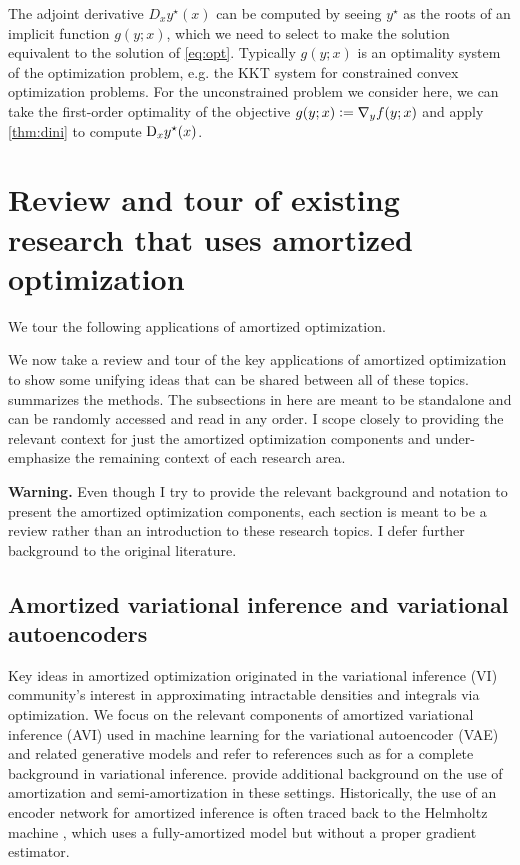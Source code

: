 \documentclass[twoside,11pt]{article}
\newcommand{\eg}{e.g.\xspace}
\begin{document}
The adjoint derivative $D_x y^\star(x)$ can be computed
by seeing $y^\star$ as the roots of an implicit
function $g(y;x)$, which we need to select to
make the solution equivalent to the solution
of \cref{eq:opt}.
Typically $g(y;x)$ is an optimality system of
the optimization problem, \eg the KKT system
for constrained convex optimization problems.
For the unconstrained problem we consider here,
we can take the first-order optimality of
the objective $g(y;x) \vcentcolon= \nabla_y f(y; x)$
and apply \cref{thm:dini} to compute
$\mathrm{D}_x y^\star(x)$.


\section{Review and tour of existing research that uses amortized optimization}
\label{sec:apps}

\begin{table}[t]
  \caption{We tour the following applications of amortized optimization.}
  \vspace{3mm}
  
  \label{tab:rw}
\end{table}

We now take a review and tour of the key applications
of amortized optimization to show some unifying ideas
that can be shared between all of these topics.
 summarizes the methods.
The subsections in here are meant to be standalone
and can be randomly accessed and read in any order.
I scope closely to providing the relevant context for
just the amortized optimization components and
under-emphasize the remaining context of each research area.

\textbf{Warning.}
Even though I try to provide the relevant background and notation to
present the amortized optimization components, each section is
meant to be a review rather than an introduction to
these research topics.
I defer further background to the original literature.

\subsection{Amortized variational inference and
  variational autoencoders}
\label{sec:apps:avi}
Key ideas in amortized optimization originated in the
variational inference (VI) community's interest in
approximating intractable densities and integrals
via optimization.
We focus on the relevant components of amortized
variational inference (AVI) used in machine learning
for the variational autoencoder (VAE) and
related generative models
\citep{kingma2013auto,rezende2014stochastic,mnih2014neural,rezende2015variational,higgins2016beta,doersch2016tutorial,kingma2019introduction}
and refer to references such as
\citet{jordan1999introduction,wainwright2008graphical,blei2017variational}
for a complete background in variational inference.
\citet{kim2020deep,marino2021learned} provide additional background
on the use of amortization and semi-amortization in these settings.
Historically, the use of an encoder network for amortized inference
is often traced back to the Helmholtz machine \citep{dayan1995helmholtz},
which uses a fully-amortized model but without a proper gradient estimator.
\end{document}
